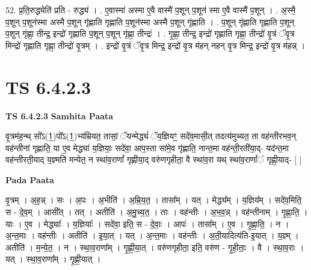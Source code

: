 \documentclass[17pt]{extarticle}
\begin{document}
52. प्र॒ति॒रुद्ध्येति॑ प्रति - रुद्ध्य॑ । . ए॒वास्मा॑ अस्मा ए॒वै वास्मै॑ प॒शून् प॒शून॑ स्मा ए॒वै वास्मै॑ प॒शून् । . अ॒स्मै॒ प॒शून् प॒शून॑स्मा अस्मै प॒शून् गृ॑ह्णाति गृह्णाति प॒शून॑स्मा अस्मै प॒शून् गृ॑ह्णाति । . प॒शून् गृ॑ह्णाति गृह्णाति प॒शून् प॒शून् गृ॑ह्णा॒ तीन्द्र॒ इन्द्रो॑ गृह्णाति प॒शून् प॒शून् गृ॑ह्णा॒ तीन्द्रः॑ । . गृ॒ह्णा॒ तीन्द्र॒ इन्द्रो॑ गृह्णाति गृह्णा॒ तीन्द्रो॑ वृ॒त्रं ॅवृ॒त्र मिन्द्रो॑ गृह्णाति गृह्णा॒ तीन्द्रो॑ वृ॒त्रम् । . इन्द्रो॑ वृ॒त्रं ॅवृ॒त्र मिन्द्र॒ इन्द्रो॑ वृ॒त्र म॑हन् नहन् वृ॒त्र मिन्द्र॒ इन्द्रो॑ वृ॒त्र म॑हन्न् । \newline
\pagebreak
{}

\section{ TS 6.4.2.3 }

\textbf{TS 6.4.2.3 } \newline
\textbf{Samhita Paata} \newline

वृ॒त्रम॑ह॒न्थ् सो᳚ऽ(1॒)पो᳚ऽ(1॒)भ्य॑म्रियत॒ तासां॒ ॅयन्मेद्ध्यं॑ ॅय॒ज्ञियꣳ॒॒ सदे॑व॒मासी॒त् तदत्य॑मुच्यत॒ ता वह॑न्तीरभव॒न् वह॑न्तीनां गृह्णाति॒ या ए॒व मेद्ध्या॑ य॒ज्ञियाः॒ सदे॑वा॒ आप॒स्ता सा॑मे॒व गृ॑ह्णाति॒ नान्त॒मा वह॑न्ती॒रती॑या॒द्- यद॑न्त॒मा वह॑न्तीरती॒याद् य॒ज्ञ्मति॑ मन्येत॒ न स्था॑व॒राणां᳚ गृह्णीया॒द् वरु॑णगृहीता॒ वै स्था॑व॒रा यथ् स्था॑व॒राणां᳚ं गृह्णी॒याद्- [  ] \newline

\textbf{Pada Paata} \newline

वृ॒त्रम् । अ॒ह॒न्न् । सः । अ॒पः । अ॒भीति॑ । अ॒म्रि॒य॒त॒ । तासा᳚म् । यत् । मेद्ध्य᳚म् । य॒ज्ञिय᳚म् । सदे॑व॒मिति॒ स - दे॒व॒म् । आसी᳚त् । तत् । अतीति॑ । अ॒मु॒च्य॒त॒ । ताः । वह॑न्तीः । अ॒भ॒व॒न्न् । वह॑न्तीनाम् । गृ॒ह्णा॒ति॒ । याः । ए॒व । मेद्ध्याः᳚ । य॒ज्ञियाः᳚ । सदे॑वा॒ इति॒ स - दे॒वाः॒ । आपः॑ । तासा᳚म् । ए॒व । गृ॒ह्णा॒ति॒ । न । अ॒न्त॒माः । वह॑न्तीः । अतीति॑ । इ॒या॒त् । यत् । अ॒न्त॒माः । वह॑न्तीः । अ॒ती॒यादित्य॑ति-इ॒यात् । य॒ज्ञ्म् । अतीति॑ । म॒न्ये॒त॒ । न । स्था॒व॒राणा᳚म् । गृ॒ह्णी॒या॒त् । वरु॑णगृहीता॒ इति॒ वरु॑ण - गृ॒ही॒ताः॒ । वै । स्था॒व॒राः । यत् । स्था॒व॒राणा᳚म् । गृ॒ह्णी॒यात् ।  \newline
\end{document}
